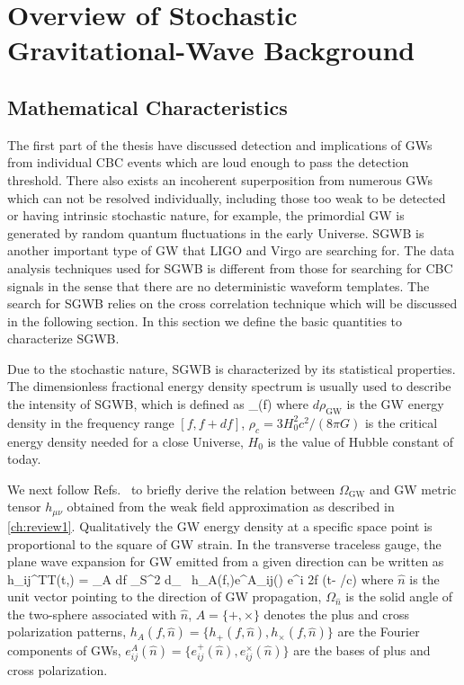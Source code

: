 


\chapterend

\chapter{Overview of Stochastic Gravitational-Wave Background}\label{ch:SGWBOverview}

\section{Mathematical Characteristics}

The first part of the thesis have discussed detection and implications of \acp{GW} from individual \ac{CBC} events which are loud enough to pass the detection threshold.
There also exists an incoherent superposition from numerous \acp{GW} which can not be resolved individually, including those too weak to be detected or having intrinsic stochastic nature, for example, the primordial \ac{GW} is generated by random quantum fluctuations in the early Universe.
\ac{SGWB} is another important type of \ac{GW} that LIGO and Virgo are searching for.
The data analysis techniques used for \ac{SGWB} is different from those for searching for \ac{CBC} signals in the sense that there are no deterministic waveform templates.
The search for \ac{SGWB} relies on the cross correlation technique which will be discussed in the following section.
In this section we define the basic quantities to characterize \ac{SGWB}.

Due to the stochastic nature, \ac{SGWB} is characterized by its statistical properties. 
The dimensionless fractional energy density spectrum is usually used to describe the intensity of \ac{SGWB}, which is defined as
\be
\Omega_(f) \equiv {} 
\ee
where $d\rho_\text{GW}$ is the \ac{GW} energy density in the frequency range $[f,f+df]$, $\rho_c = 3H_0^2c^2/(8\pi G)$ is the critical energy density needed for a close Universe, $H_0$ is the value of Hubble constant of today.

We next follow Refs.~\cite{SGWBseminal1,SGWBseminal2,SGWBlivingreview} to briefly derive the relation between $\Omega_\text{GW}$ and \ac{GW} metric tensor $h_{\mu\nu}$ obtained from the weak field approximation as described in \cref{ch:review1}.
Qualitatively the \ac{GW} energy density at a specific space point is proportional to the square of \ac{GW} strain.
In the transverse traceless gauge, the plane wave expansion for \ac{GW} emitted from a given direction can be written as
\be\label{eq:hijplanewave}
h_{ij}^{TT}(t,) = \sum_A \int df \int_{S^2} d{\Omega}_{}~ h_A(f,)e^A_{ij}() e^{i 2\pi f (t- \cdot{}/c)}
\ee
where $\hat{n}$ is the unit vector pointing to the direction of \ac{GW} propagation, ${\Omega}_{\hat{n}}$ is the solid angle of the two-sphere associated with $\hat{n}$, $A =\{+,\times\}$ denotes the plus and cross polarization patterns, $h_A(f,\hat{n}) = \{h_+(f,\hat{n}),h_\times(f,\hat{n})\}$ are the Fourier components of \acp{GW}, $e^A_{ij}(\hat{n}) = \{e^+_{ij}(\hat{n}),e^\times_{ij}(\hat{n})\}$ are the bases of plus and cross polarization.

